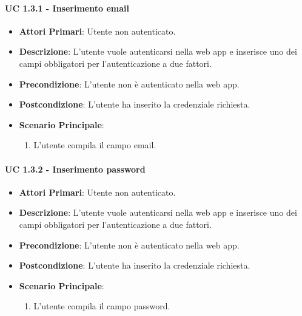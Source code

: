 			\paragraph{UC 1.3.1 - Inserimento email}
			\begin{itemize}
				\item \textbf{Attori Primari}: Utente non autenticato.
				\item \textbf{Descrizione}: L'utente vuole autenticarsi nella web app e inserisce uno dei campi obbligatori per l'autenticazione a due fattori.
				\item \textbf{Precondizione}: L'utente non è autenticato nella web app.
				\item \textbf{Postcondizione}: L'utente ha inserito la credenziale richiesta.
				\item \textbf{Scenario Principale}:
				\begin{enumerate}
					\item L'utente compila il campo email.
				\end{enumerate}	
			\end{itemize}

			\paragraph{UC 1.3.2 - Inserimento password}
			\begin{itemize}
				\item \textbf{Attori Primari}: Utente non autenticato.
				\item \textbf{Descrizione}: L'utente vuole autenticarsi nella web app e inserisce uno dei campi obbligatori per l'autenticazione a due fattori.
				\item \textbf{Precondizione}: L'utente non è autenticato nella web app.
				\item \textbf{Postcondizione}: L'utente ha inserito la credenziale richiesta.
				\item \textbf{Scenario Principale}:
				\begin{enumerate}
					\item L'utente compila il campo password.
				\end{enumerate}	
			\end{itemize}

